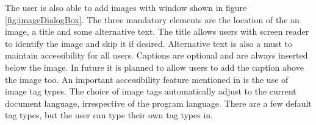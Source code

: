 The user is also able to add images with window shown in figure \ref{fig:imageDialogBox}. The three mandatory elements are the location of the an image, a title and some alternative text. The title allows users with screen reader to identify the image and skip it if desired. Alternative text is also a must to maintain accessibility for all users. Captions are optional and are always inserted below the image. In future it is planned to allow users to add the caption above the image too. An important accessibility feature mentioned in \cite{augenbitWiki} is the use of image tag types. The choice of image tags automatically adjust to the current document language, irrespective of the program language. There are a few default tag types, but the user can type their own tag types in.

